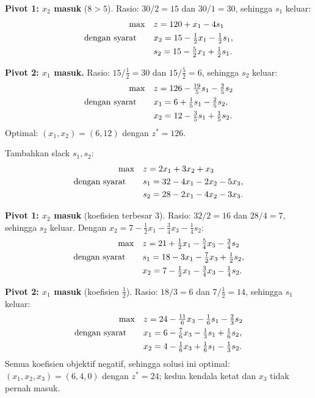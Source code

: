 \textbf{Pivot 1: $x_2$ masuk} ($8 > 5$). Rasio: $30/2 = 15$ dan
$30/1 = 30$, sehingga $s_1$ keluar:
\[
\begin{aligned}
\max\quad & z = 120 + x_1 - 4s_1 \\
\mbox{dengan syarat}\quad\quad & x_2 = 15 - \tfrac12 x_1 - \tfrac12 s_1, \\
& s_2 = 15 - \tfrac52 x_1 + \tfrac12 s_1.
\end{aligned}
\]

\textbf{Pivot 2: $x_1$ masuk.} Rasio: $15/\tfrac12 = 30$ dan
$15/\tfrac52 = 6$, sehingga $s_2$ keluar:
\[
\begin{aligned}
\max\quad & z = 126 - \tfrac{19}{5} s_1 - \tfrac25 s_2 \\
\mbox{dengan syarat}\quad\quad & x_1 = 6 + \tfrac15 s_1 - \tfrac25 s_2, \\
& x_2 = 12 - \tfrac35 s_1 + \tfrac15 s_2.
\end{aligned}
\]
Optimal: $(x_1, x_2) = (6, 12)$ dengan $z^* = 126$.


Tambahkan slack $s_1, s_2$:
\[
\begin{aligned}
\max\quad & z = 2x_1 + 3x_2 + x_3 \\
\mbox{dengan syarat}\quad\quad & s_1 = 32 - 4x_1 - 2x_2 - 5x_3, \\
& s_2 = 28 - 2x_1 - 4x_2 - 3x_3.
\end{aligned}
\]

\textbf{Pivot 1: $x_2$ masuk} (koefisien terbesar $3$). Rasio:
$32/2 = 16$ dan $28/4 = 7$, sehingga $s_2$ keluar. Dengan
$x_2 = 7 - \tfrac12 x_1 - \tfrac34 x_3 - \tfrac14 s_2$:
\[
\begin{aligned}
\max\quad & z = 21 + \tfrac12 x_1 - \tfrac54 x_3 - \tfrac34 s_2 \\
\mbox{dengan syarat}\quad\quad & s_1 = 18 - 3x_1 - \tfrac72 x_3 + \tfrac12 s_2, \\
& x_2 = 7 - \tfrac12 x_1 - \tfrac34 x_3 - \tfrac14 s_2.
\end{aligned}
\]

\textbf{Pivot 2: $x_1$ masuk} (koefisien $\tfrac12$). Rasio:
$18/3 = 6$ dan $7/\tfrac12 = 14$, sehingga $s_1$ keluar:
\[
\begin{aligned}
\max\quad & z = 24 - \tfrac{11}{6} x_3 - \tfrac16 s_1 - \tfrac23 s_2 \\
\mbox{dengan syarat}\quad\quad & x_1 = 6 - \tfrac76 x_3 - \tfrac13 s_1 + \tfrac16 s_2, \\
& x_2 = 4 - \tfrac16 x_3 + \tfrac16 s_1 - \tfrac13 s_2.
\end{aligned}
\]
Semua koefisien objektif negatif, sehingga solusi ini optimal:
$(x_1, x_2, x_3) = (6, 4, 0)$ dengan $z^* = 24$; kedua kendala ketat
dan $x_3$ tidak pernah masuk.

